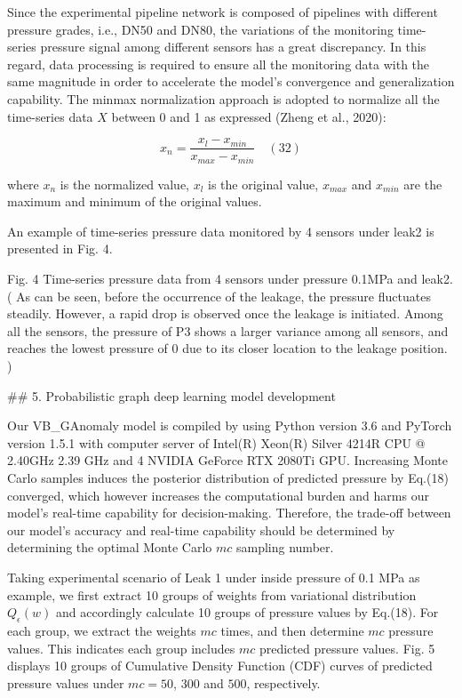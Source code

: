 Since the experimental pipeline network is composed of pipelines with different pressure grades, i.e., DN50 and DN80, the variations of the monitoring time-series pressure signal among different sensors has a great discrepancy. In this regard, data processing is required to ensure all the monitoring data with the same magnitude in order to accelerate the model’s convergence and generalization capability. The minmax normalization approach is adopted to normalize all the time-series data $X$ between 0 and 1 as expressed (Zheng et al., 2020):

$$
x_n = \frac{x_l - x_{min}}{x_{max} - x_{min}} \quad (32)
$$

where $x_n$ is the normalized value, $x_l$ is the original value, $x_{max}$ and $x_{min}$ are the maximum and minimum of the original values.


An example of time-series pressure data monitored by 4 sensors under leak2 is presented in Fig. 4.

Fig. 4 Time-series pressure data from 4 sensors under pressure 0.1MPa and leak2.(
As can be seen, before the occurrence of the leakage, the pressure fluctuates steadily. However, a rapid drop is observed once the leakage is initiated. Among all the sensors, the pressure of P3 shows a larger variance among all sensors, and reaches the lowest pressure of 0 due to its closer location to the leakage position.
)

## 5. Probabilistic graph deep learning model development

Our VB\_GAnomaly model is compiled by using Python version 3.6 and PyTorch version 1.5.1 with computer server of Intel(R) Xeon(R) Silver 4214R CPU @ 2.40GHz 2.39 GHz and 4 NVIDIA GeForce RTX 2080Ti GPU. Increasing Monte Carlo samples induces the posterior distribution of predicted pressure by Eq.(18) converged, which however increases the computational burden and harms our model’s real-time capability for decision-making. Therefore, the trade-off between our model’s accuracy and real-time capability should be determined by determining the optimal Monte Carlo $mc$ sampling number.

Taking experimental scenario of Leak 1 under inside pressure of 0.1 MPa as example, we first extract 10 groups of weights from variational distribution $Q_\epsilon(w)$ and accordingly calculate 10 groups of pressure values by Eq.(18). For each group, we extract the weights $mc$ times, and then determine $mc$ pressure values. This indicates each group includes $mc$ predicted pressure values. Fig. 5 displays 10 groups of Cumulative Density Function (CDF) curves of predicted pressure values under $mc=50$, $300$ and $500$, respectively.


